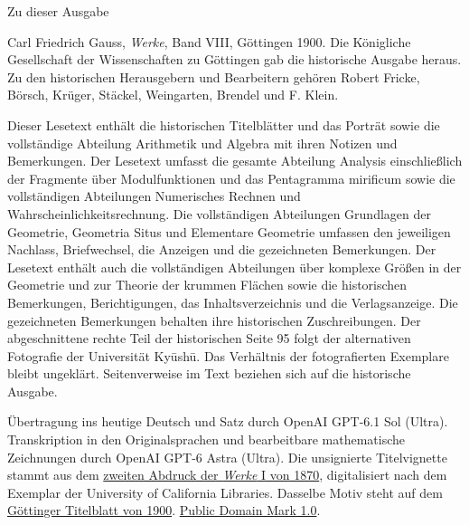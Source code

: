\begin{center}\large Zu dieser Ausgabe\end{center}
\noindent Carl Friedrich Gauss, \emph{Werke}, Band VIII, Göttingen 1900.
Die Königliche Gesellschaft der Wissenschaften zu Göttingen gab die historische Ausgabe heraus.
Zu den historischen Herausgebern und Bearbeitern gehören Robert Fricke, Börsch, Krüger, Stäckel, Weingarten, Brendel und F. Klein.

\noindent Dieser Lesetext enthält die historischen Titelblätter und das Porträt
sowie die vollständige Abteilung Arithmetik und Algebra mit ihren Notizen und
Bemerkungen. Der Lesetext umfasst die gesamte Abteilung Analysis einschließlich der Fragmente über Modulfunktionen und das Pentagramma mirificum sowie die vollständigen Abteilungen Numerisches Rechnen und Wahrscheinlichkeitsrechnung. Die vollständigen Abteilungen Grundlagen der Geometrie, Geometria Situs und Elementare Geometrie umfassen den jeweiligen Nachlass, Briefwechsel, die Anzeigen und die gezeichneten Bemerkungen. Der Lesetext enthält auch die vollständigen Abteilungen über komplexe Größen in der Geometrie und zur Theorie der krummen Flächen sowie die historischen Bemerkungen, Berichtigungen, das Inhaltsverzeichnis und die Verlagsanzeige. Die gezeichneten Bemerkungen behalten ihre historischen Zuschreibungen. Der abgeschnittene rechte Teil der historischen Seite 95 folgt der alternativen Fotografie der Universität Kyūshū. Das Verhältnis der fotografierten Exemplare bleibt ungeklärt. Seitenverweise im Text beziehen sich auf die historische Ausgabe.

\noindent Übertragung ins heutige Deutsch und Satz durch OpenAI GPT-6.1 Sol (Ultra).
Transkription in den Originalsprachen und bearbeitbare mathematische Zeichnungen durch OpenAI GPT-6 Astra (Ultra).
Die unsignierte Titelvignette stammt aus dem \href{https://commons.wikimedia.org/w/index.php?oldid=1179960952}{zweiten Abdruck der \textit{Werke} I von 1870}, digitalisiert nach dem Exemplar der University of California Libraries. Dasselbe Motiv steht auf dem \href{https://gdz.sub.uni-goettingen.de/id/PPN236010751}{Göttinger Titelblatt von 1900}. \href{https://creativecommons.org/publicdomain/mark/1.0/}{Public Domain Mark 1.0}.
\clearpage
